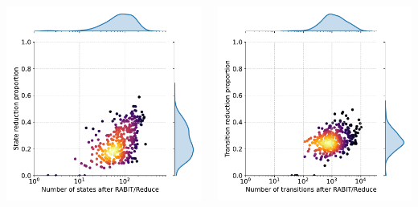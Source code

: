 \begin{frame}
{\begin{columns}
        \includegraphics[width=1.1\textwidth]{img/emails-states.pdf}

      \includegraphics[width=1.1\textwidth]{img/emails-trans.pdf}
    \end{columns}
  }
\end{frame}


